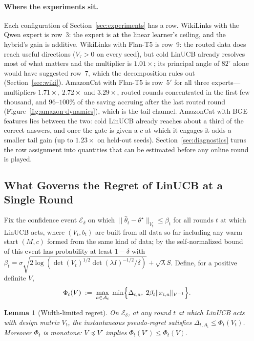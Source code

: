 \documentclass{article}
\newtheorem{lemma}{Lemma}
\theoremstyle{definition}
\theoremstyle{remark}
\theoremstyle{remark}
\begin{document}
\paragraph{Where the experiments sit.}
Each configuration of Section~\ref{sec:experiments} has a row. WikiLinks with
the Qwen expert is row~3: the expert is at the linear learner's ceiling, and
the hybrid's gain is additive. WikiLinks with Flan-T5 is row~9: the routed
data does reach useful directions ($V_\tau>0$ on every seed), but cold LinUCB
already resolves most of what matters and the multiplier is $1.01\times$; its
principal angle of $82^\circ$ alone would have suggested row~7, which the
decomposition rules out (Section~\ref{sec:wiki}). AmazonCat with Flan-T5 is
row~$5'$ for all three experts---multipliers $1.71\times$, $2.72\times$ and
$3.29\times$, routed rounds concentrated in the first few thousand, and $96$--$100\%$ of
the saving accruing after the last routed round
(Figure~\ref{fig:amazon-dynamics}), which is the tail channel. AmazonCat with
BGE features lies between the two: cold LinUCB already reaches about a third of
the correct answers, and once the gate is given a $c$ at which it engages it
adds a smaller tail gain (up to $1.23\times$ on held-out seeds). Section~\ref{sec:diagnostics} turns the row assignment into
quantities that can be estimated before any online round is played.



\subsection{What Governs the Regret of LinUCB at a Single Round}
\label{sec:width}

Fix the confidence event $\mathcal E_\delta$ on which
$\|\widehat\theta_t-\theta^\star\|_{V_t}\le\beta_t$ for all rounds $t$ at
which LinUCB acts, where $(V_t,b_t)$ are built from all data so far including
any warm start $(M,c)$ formed from the same kind of data; by the
self-normalized bound of \cite{abbasi2011improved} this event has probability
at least $1-\delta$ with
$\beta_t=\sigma\sqrt{2\log(\det(V_t)^{1/2}\det(\lambda I)^{-1/2}/\delta)}+\sqrt\lambda S$.
Define, for a positive definite $V$,
\begin{equation}
\label{eq:phi}
\Phi_t(V)\;:=\;\max_{a\in\mathcal A_t}\;\min\Bigl\{\Delta_{t,a},\;2\beta_t\|x_{t,a}\|_{V^{-1}}\Bigr\}.
\end{equation}

\begin{lemma}[Width-limited regret]
\label{lem:width-limited}
On $\mathcal E_\delta$, at any round $t$ at which LinUCB acts with design
matrix $V_t$, the instantaneous pseudo-regret satisfies
$\Delta_{t,A_t}\le\Phi_t(V_t)$. Moreover $\Phi_t$ is monotone: $V\preceq V'$
implies $\Phi_t(V')\le\Phi_t(V)$.
\end{lemma}
\end{document}
